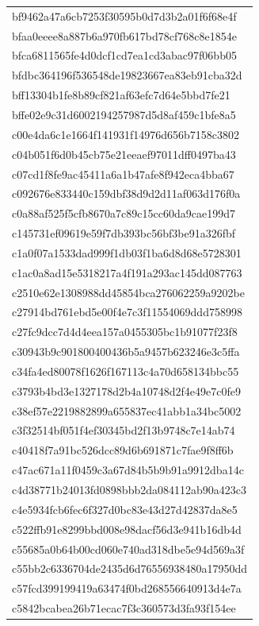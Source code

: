 \begin{tabular}{l}
bf9462a47a6cb7253f30595b0d7d3b2a01f6f68e4f \\
bfaa0eeee8a887b6a970fb617bd78cf768c8e1854e \\
bfca6811565fe4d0dcf1cd7ea1cd3abac97f06bb05 \\
bfdbc364196f536548de19823667ea83eb91cba32d \\
bff13304b1fe8b89cf821af63efc7d64e5bbd7fe21 \\
bffe02e9c31d6002194257987d5d8af459c1bfe8a5 \\
c00e4da6c1e1664f141931f14976d656b7158c3802 \\
c04b051f6d0b45cb75e21eeaef97011dff0497ba43 \\
c07cd1f8fe9ac45411a6a1b47afe8f942eca4bba67 \\
c092676e833440c159dbf38d9d2d11af063d176f0a \\
c0a88af525f5cfb8670a7c89c15cc60da9cae199d7 \\
c145731ef09619e59f7db393bc56bf3be91a326fbf \\
c1a0f07a1533dad999f1db03f1ba6d8d68e5728301 \\
c1ac0a8ad15e5318217a4f191a293ac145dd087763 \\
c2510e62e1308988dd45854bca276062259a9202be \\
c27914bd761ebd5e00f4e7c3f11554069ddd758998 \\
c27fc9dcc7d4d4eea157a0455305bc1b91077f23f8 \\
c30943b9c901800400436b5a9457b623246e3c5ffa \\
c34fa4ed80078f1626f167113c4a70d658134bbc55 \\
c3793b4bd3e1327178d2b4a10748d2f4e49e7c0fe9 \\
c38ef57e2219882899a655837ec41abb1a34bc5002 \\
c3f32514bf051f4ef30345bd2f13b9748c7e14ab74 \\
c40418f7a91bc526dcc89d6b691871c7fae9f8ff6b \\
c47ac671a11f0459c3a67d84b5b9b91a9912dba14c \\
c4d38771b24013fd0898bbb2da084112ab90a423c3 \\
c4e5934fcb6fec6f327d0bc83e43d27d42837da8e5 \\
c522ffb91e8299bbd008e98dacf56d3e941b16db4d \\
c55685a0b64b00cd060e740ad318dbe5e94d569a3f \\
c55bb2c6336704de2435d6d76556938480a17950dd \\
c57fcd399199419a63474f0bd268556640913d4e7a \\
c5842bcabea26b71ecac7f3c360573d3fa93f154ee \\

\end{tabular}
